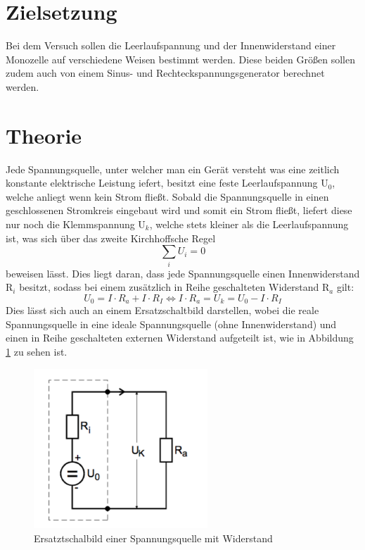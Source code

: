 \section{Zielsetzung}
Bei dem Versuch sollen die Leerlaufspannung und der Innenwiderstand einer Monozelle
auf verschiedene Weisen bestimmt werden. Diese beiden Größen sollen zudem auch von
einem Sinus- und Rechteckspannungsgenerator berechnet werden.

\section{Theorie}
Jede Spannungsquelle, unter welcher man ein Gerät versteht was eine zeitlich konstante
elektrische Leistung iefert, besitzt eine feste Leerlaufspannung $\text{U}_0$, welche
anliegt wenn kein Strom fließt. Sobald die Spannungsquelle in einen geschlossenen
Stromkreis eingebaut wird und somit ein Strom fließt,
liefert diese nur noch die Klemmspannung $\text{U}_k$, welche stets kleiner als
die Leerlaufspannung ist, was sich über das zweite Kirchhoffsche Regel
\begin{equation}
  \sum_i U_i = 0
\end{equation}
beweisen lässt. Dies liegt daran, dass jede Spannungsquelle einen Innenwiderstand
$\text{R}_i$ besitzt, sodass bei einem zusätzlich in Reihe geschalteten Widerstand
$\text{R}_a$ gilt:
\begin{equation}
  U_0 = I\cdot R_a + I\cdot R_I \iff I\cdot R_a = U_k = U_0 - I\cdot R_I
\end{equation}
Dies lässt sich auch an einem Ersatzschaltbild darstellen, wobei die reale
Spannungsquelle in eine ideale Spannungsquelle (ohne Innenwiderstand) und einen
in Reihe geschalteten externen Widerstand aufgeteilt ist, wie in Abbildung
\ref{fig:schalt1} zu sehen ist.
\begin{figure}[H]
  \centering
  \includegraphics[height=6cm]{schalt1.png}
  \caption{Ersatztschalbild einer Spannungsquelle mit Widerstand \cite{skript}}
  \label{fig:schalt1}
\end{figure}
